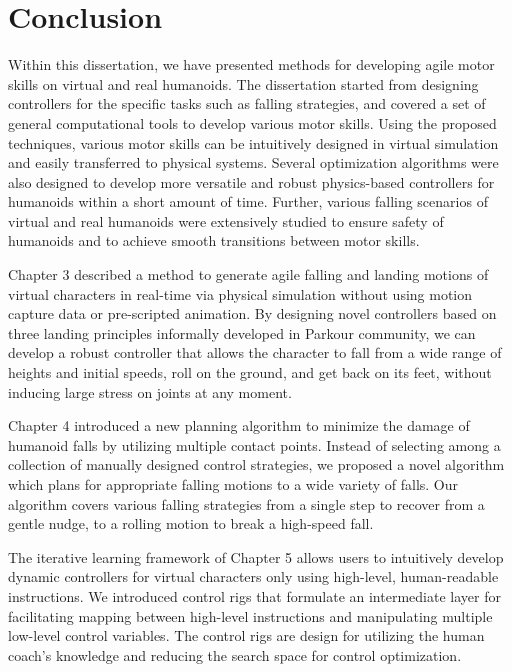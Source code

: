 \chapter{Conclusion}

Within this dissertation, we have presented methods for developing agile motor
skills on virtual and real humanoids.
The dissertation started from designing controllers for the specific tasks
such as falling strategies,
and covered a set of general computational tools to develop
various motor skills.
Using the proposed techniques, various motor skills can be intuitively designed
in virtual simulation and easily transferred to physical systems.
Several optimization algorithms were also designed to develop more versatile and
robust physics-based controllers for humanoids within a short amount of time.
Further, various falling scenarios of virtual and real humanoids were
extensively studied to ensure safety of humanoids and to achieve smooth
transitions between motor skills.

Chapter 3 described a method to generate agile falling and landing motions of
virtual characters in real-time via physical simulation
without using motion capture data or pre-scripted animation.
By designing novel controllers based on three landing principles informally
developed in Parkour community, we can develop a robust controller that
allows the character to fall from a wide range of heights and initial speeds,
roll on the ground, and get back on its feet, without inducing large stress on
joints at any moment.

Chapter 4 introduced a new planning algorithm to minimize the damage
of humanoid falls by utilizing multiple contact points.
Instead of selecting among a collection of manually designed control
strategies, we proposed a novel algorithm which plans for appropriate
falling motions to a wide variety of falls.
Our algorithm covers various falling strategies from a single step to recover
from a gentle nudge, to a rolling motion to break a high-speed fall.

The iterative learning framework of Chapter 5 allows users to intuitively
develop dynamic controllers for virtual characters only using high-level,
human-readable instructions.
We introduced control rigs that
formulate an intermediate layer 
for facilitating mapping between high-level instructions and manipulating
multiple low-level control variables.
The control rigs are design for utilizing the human coach's knowledge and 
reducing the search space for control optimization.

